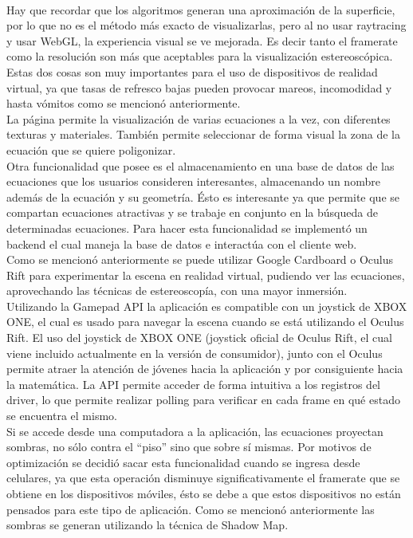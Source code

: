 \documentclass[12pt]{article}
\begin{document}
\\Hay que recordar que los algoritmos generan una aproximación de la superficie, por lo que no es el método más exacto de visualizarlas, pero al no usar raytracing y usar WebGL, la experiencia visual se ve mejorada. Es decir tanto el framerate como la resolución son más que aceptables para la visualización estereoscópica. Estas dos cosas son muy importantes para el uso de dispositivos de realidad virtual, ya que tasas de refresco bajas pueden provocar mareos, incomodidad y hasta vómitos como se mencionó anteriormente.
\\La página permite la visualización de varias ecuaciones a la vez, con diferentes texturas y materiales. También permite seleccionar de forma visual la zona de la ecuación que se quiere poligonizar.
\\Otra funcionalidad que posee es el almacenamiento en una base de datos de las ecuaciones que los usuarios consideren interesantes, almacenando un nombre además de la ecuación y su geometría. Ésto es interesante ya que permite que se compartan ecuaciones atractivas y se trabaje en conjunto en la búsqueda de determinadas ecuaciones. Para hacer esta funcionalidad se implementó un backend el cual maneja la base de datos e interactúa con el cliente web.
\\Como se mencionó anteriormente se puede utilizar Google Cardboard o Oculus Rift para experimentar la escena en realidad virtual, pudiendo ver las ecuaciones, aprovechando las técnicas de estereoscopía, con una mayor inmersión.
\\Utilizando la Gamepad API\cite{gamepadapi} la aplicación es compatible con un joystick de XBOX ONE, el cual es usado para navegar la escena cuando se está utilizando el Oculus Rift. El uso del joystick de XBOX ONE (joystick oficial de Oculus Rift, el cual viene incluido actualmente en la versión de consumidor), junto con el Oculus permite atraer la atención de jóvenes hacia la aplicación y por consiguiente hacia la matemática. La API permite acceder de forma intuitiva a los registros del driver\cite{engine}, lo que permite realizar polling para verificar en cada frame en qué estado se encuentra el mismo.
\\Si se accede desde una computadora a la aplicación, las ecuaciones proyectan sombras, no sólo contra el “piso” sino que sobre sí mismas. Por motivos de optimización se decidió sacar esta funcionalidad cuando se ingresa desde celulares, ya que esta operación disminuye significativamente el framerate que se obtiene en los dispositivos móviles, ésto se debe a que estos dispositivos no están pensados para este tipo de aplicación. Como se mencionó anteriormente las sombras se generan utilizando la técnica de Shadow Map\cite{shadowmap}\cite{realtimerendering}.
\end{document}
